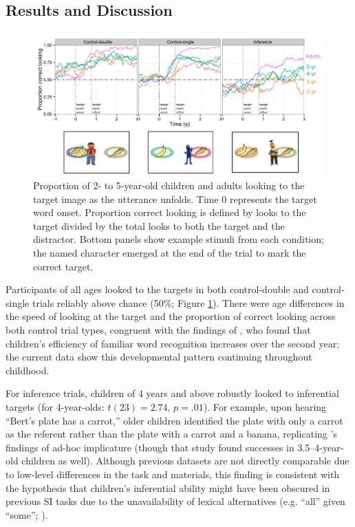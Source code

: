 \documentclass[10pt,letterpaper]{article}
\begin{document}
\subsection{Results and Discussion}

\begin{figure}[t]
\begin{center} 
  \includegraphics[width=.8\textwidth]{figures/expt1-accuracy.pdf}
  \caption{\label{fig:age} Proportion of 2- to 5-year-old children and adults looking to the target image as the utterance unfolds. Time 0 represents the target word onset. Proportion correct looking is defined by looks to the target divided by the total looks to both the target and the distractor. Bottom panels show example stimuli from each condition; the named character emerged at the end of the trial to mark the correct target.}
  \end{center} 
\end{figure}


Participants of all ages looked to the targets in both control-double and control-single trials reliably above chance (50\%; Figure \ref{fig:age}). There were age differences in the speed of looking at the target and the proportion of correct looking across both control trial types, congruent with the findings of , who found that children's efficiency of familiar word recognition increases over the second year; the current data show this developmental pattern continuing throughout childhood. 

For inference trials, children of 4 years and above robustly looked to inferential targets (for 4-year-olds: $t(23) = 2.74$, $p =.01$). For example, upon hearing ``Bert's plate has a carrot,'' older children identified the plate with only a carrot as the referent rather than the plate with a carrot and a banana, replicating 's findings of ad-hoc implicature (though that study found successes in 3.5--4-year-old children as well). Although previous datasets are not directly comparable due to low-level differences in the task and materials, this finding is consistent with the hypothesis that children's inferential ability might have been obscured in previous SI tasks due to the unavailability of lexical alternatives (e.g. ``all'' given ``some''; ).
\end{document}
